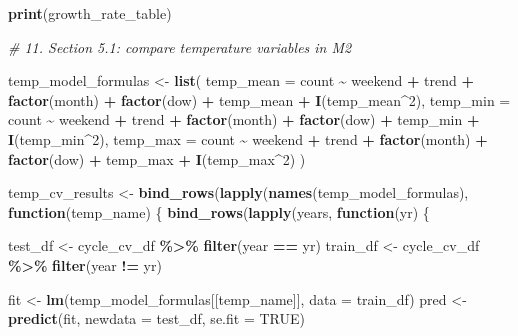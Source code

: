\documentclass[
]{article}
\newenvironment{Shaded}{\begin{snugshade}}{\end{snugshade}}
\newcommand{\AttributeTok}[1]{\textcolor[rgb]{0.13,0.29,0.53}{#1}}
\newcommand{\CommentTok}[1]{\textcolor[rgb]{0.56,0.35,0.01}{\textit{#1}}}
\newcommand{\ConstantTok}[1]{\textcolor[rgb]{0.56,0.35,0.01}{#1}}
\newcommand{\ControlFlowTok}[1]{\textcolor[rgb]{0.13,0.29,0.53}{\textbf{#1}}}
\newcommand{\DecValTok}[1]{\textcolor[rgb]{0.00,0.00,0.81}{#1}}
\newcommand{\FunctionTok}[1]{\textcolor[rgb]{0.13,0.29,0.53}{\textbf{#1}}}
\newcommand{\NormalTok}[1]{#1}
\newcommand{\OtherTok}[1]{\textcolor[rgb]{0.56,0.35,0.01}{#1}}
\newcommand{\SpecialCharTok}[1]{\textcolor[rgb]{0.81,0.36,0.00}{\textbf{#1}}}
\begin{document}
\begin{Shaded}
\begin{Highlighting}[]
\FunctionTok{print}\NormalTok{(growth\_rate\_table)}

\CommentTok{\# 11. Section 5.1: compare temperature variables in M2}

\NormalTok{temp\_model\_formulas }\OtherTok{\textless{}{-}} \FunctionTok{list}\NormalTok{(}
  \AttributeTok{temp\_mean =}\NormalTok{ count }\SpecialCharTok{\textasciitilde{}}\NormalTok{ weekend }\SpecialCharTok{+}\NormalTok{ trend }\SpecialCharTok{+} \FunctionTok{factor}\NormalTok{(month) }\SpecialCharTok{+} \FunctionTok{factor}\NormalTok{(dow) }\SpecialCharTok{+}
\NormalTok{    temp\_mean }\SpecialCharTok{+} \FunctionTok{I}\NormalTok{(temp\_mean}\SpecialCharTok{\^{}}\DecValTok{2}\NormalTok{),}
  \AttributeTok{temp\_min =}\NormalTok{ count }\SpecialCharTok{\textasciitilde{}}\NormalTok{ weekend }\SpecialCharTok{+}\NormalTok{ trend }\SpecialCharTok{+} \FunctionTok{factor}\NormalTok{(month) }\SpecialCharTok{+} \FunctionTok{factor}\NormalTok{(dow) }\SpecialCharTok{+}
\NormalTok{    temp\_min }\SpecialCharTok{+} \FunctionTok{I}\NormalTok{(temp\_min}\SpecialCharTok{\^{}}\DecValTok{2}\NormalTok{),}
  \AttributeTok{temp\_max =}\NormalTok{ count }\SpecialCharTok{\textasciitilde{}}\NormalTok{ weekend }\SpecialCharTok{+}\NormalTok{ trend }\SpecialCharTok{+} \FunctionTok{factor}\NormalTok{(month) }\SpecialCharTok{+} \FunctionTok{factor}\NormalTok{(dow) }\SpecialCharTok{+}
\NormalTok{    temp\_max }\SpecialCharTok{+} \FunctionTok{I}\NormalTok{(temp\_max}\SpecialCharTok{\^{}}\DecValTok{2}\NormalTok{)}
\NormalTok{)}

\NormalTok{temp\_cv\_results }\OtherTok{\textless{}{-}} \FunctionTok{bind\_rows}\NormalTok{(}\FunctionTok{lapply}\NormalTok{(}\FunctionTok{names}\NormalTok{(temp\_model\_formulas), }\ControlFlowTok{function}\NormalTok{(temp\_name) \{}
  \FunctionTok{bind\_rows}\NormalTok{(}\FunctionTok{lapply}\NormalTok{(years, }\ControlFlowTok{function}\NormalTok{(yr) \{}
    
\NormalTok{    test\_df  }\OtherTok{\textless{}{-}}\NormalTok{ cycle\_cv\_df }\SpecialCharTok{\%\textgreater{}\%} \FunctionTok{filter}\NormalTok{(year }\SpecialCharTok{==}\NormalTok{ yr)}
\NormalTok{    train\_df }\OtherTok{\textless{}{-}}\NormalTok{ cycle\_cv\_df }\SpecialCharTok{\%\textgreater{}\%} \FunctionTok{filter}\NormalTok{(year }\SpecialCharTok{!=}\NormalTok{ yr)}
    
\NormalTok{    fit }\OtherTok{\textless{}{-}} \FunctionTok{lm}\NormalTok{(temp\_model\_formulas[[temp\_name]], }\AttributeTok{data =}\NormalTok{ train\_df)}
\NormalTok{    pred }\OtherTok{\textless{}{-}} \FunctionTok{predict}\NormalTok{(fit, }\AttributeTok{newdata =}\NormalTok{ test\_df, }\AttributeTok{se.fit =} \ConstantTok{TRUE}\NormalTok{)}
    

\end{Highlighting}
\end{Shaded}
\end{document}
